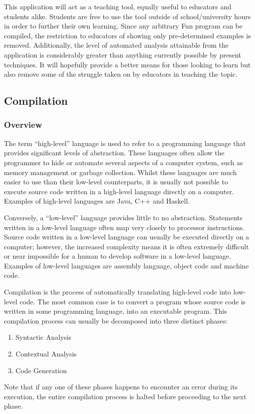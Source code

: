 \documentclass{l4proj}
\begin{document}
This application will act as a teaching tool, equally useful to educators and students alike. Students are free to use the tool outside of school/university hours in order to further their own learning. Since any arbitrary Fun program can be compiled, the restriction to educators of showing only pre-determined examples is removed. Additionally, the level of automated analysis attainable from the application is considerably greater than anything currently possible by present techniques. It will hopefully provide a better means for those looking to learn but also remove some of the struggle taken on by educators in teaching the topic.

\begin{appendices}
\chapter{Compilation}
\subsection{Overview}
The term ``high-level'' language is used to refer to a programming language that provides significant levels of abstraction. These languages often allow the programmer to hide or automate several aspects of a computer system, such as memory management or garbage collection. Whilst these languages are much easier to use than their low-level counterparts, it is usually not possible to execute source code written in a high-level language directly on a computer. Examples of high-level languages are Java, C++ and Haskell.

Conversely, a ``low-level'' language provides little to no abstraction. Statements written in a low-level language often map very closely to processor instructions. Source code written in a low-level language can usually be executed directly on a computer; however, the increased complexity means it is often extremely difficult or near impossible for a human to develop software in a low-level language. Examples of low-level languages are assembly language, object code and machine code.

Compilation is the process of automatically translating high-level code into low-level code. The most common case is to convert a program whose source code is written in some programming language, into an executable program. This compilation process can usually be decomposed into three distinct phases: 
\begin{enumerate}
\item Syntactic Analysis 
\item Contextual Analysis
\item Code Generation
\end{enumerate}
Note that if any one of these phases happens to encounter an error during its execution, the entire compilation process is halted before proceeding to the next phase.


\end{appendices}
\end{document}
